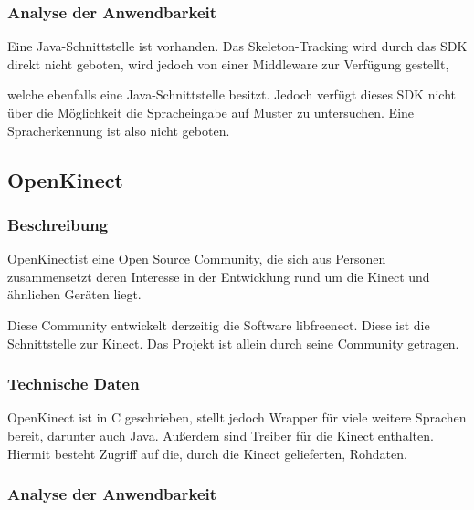 \subsubsection{Analyse der Anwendbarkeit}

Eine Java-Schnittstelle ist vorhanden. Das Skeleton-Tracking wird durch das SDK direkt nicht geboten, wird jedoch von einer Middleware zur Verf\"ugung gestellt, 

welche ebenfalls eine Java-Schnittstelle besitzt. Jedoch verf\"ugt dieses SDK nicht \"uber die M\"oglichkeit die Spracheingabe auf Muster zu untersuchen. Eine Spracherkennung ist also nicht geboten.

\newpage

\subsection{OpenKinect}

\subsubsection{Beschreibung}

OpenKinect\footnotemark[11] ist eine Open Source Community, die sich aus Personen zusammensetzt deren Interesse in der Entwicklung rund um die Kinect und \"ahnlichen Ger\"aten liegt.

Diese Community entwickelt derzeitig die Software libfreenect. Diese ist die Schnittstelle zur Kinect. Das Projekt ist allein durch seine Community getragen.


\subsubsection{Technische Daten}

OpenKinect ist in C geschrieben, stellt jedoch Wrapper f\"ur viele weitere Sprachen bereit\footnotemark[12], darunter auch Java. Außerdem sind Treiber f\"ur die Kinect enthalten.
Hiermit besteht Zugriff auf die, durch die Kinect gelieferten, Rohdaten.


\subsubsection{Analyse der Anwendbarkeit}

